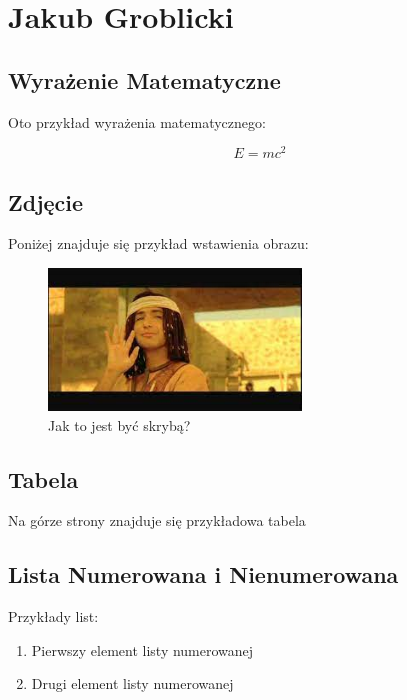 \newpage
\section{Jakub Groblicki}

\subsection{Wyrażenie Matematyczne}

Oto przykład wyrażenia matematycznego:

\begin{equation}
    E=mc^2
\end{equation}

\subsection{Zdjęcie}

Poniżej znajduje się przykład wstawienia obrazu:

\begin{figure}
    \centering
    \includegraphics[width=0.6\textwidth]{pictures/skryba.jpg}
    \caption{Jak to jest być skrybą?}
    \label{fig:skryba}
\end{figure}

\subsection{Tabela}

Na górze strony znajduje się przykładowa tabela



\subsection{Lista Numerowana i Nienumerowana}

Przykłady list:

\begin{enumerate}
    \item Pierwszy element listy numerowanej
    \item Drugi element listy numerowanej
\end{enumerate}

